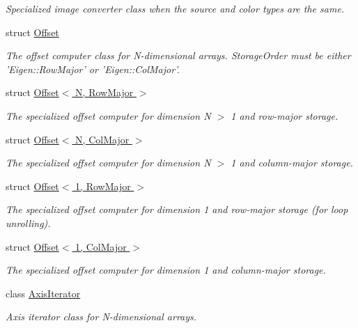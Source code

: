 \begin{DoxyCompactItemize}
\begin{DoxyCompactList}\small\item\em Specialized image converter class when the source and color types are the same. \end{DoxyCompactList}\item 
struct \hyperlink{struct_d_o_1_1_offset}{Offset}
\begin{DoxyCompactList}\small\item\em The offset computer class for N-\/dimensional arrays. Storage\-Order must be either 'Eigen\-::\-Row\-Major' or 'Eigen\-::\-Col\-Major'. \end{DoxyCompactList}\item 
struct \hyperlink{struct_d_o_1_1_offset_3_01_n_00_01_row_major_01_4}{Offset$<$ N, Row\-Major $>$}
\begin{DoxyCompactList}\small\item\em The specialized offset computer for dimension N $>$ 1 and row-\/major storage. \end{DoxyCompactList}\item 
struct \hyperlink{struct_d_o_1_1_offset_3_01_n_00_01_col_major_01_4}{Offset$<$ N, Col\-Major $>$}
\begin{DoxyCompactList}\small\item\em The specialized offset computer for dimension N $>$ 1 and column-\/major storage. \end{DoxyCompactList}\item 
struct \hyperlink{struct_d_o_1_1_offset_3_011_00_01_row_major_01_4}{Offset$<$ 1, Row\-Major $>$}
\begin{DoxyCompactList}\small\item\em The specialized offset computer for dimension 1 and row-\/major storage (for loop unrolling). \end{DoxyCompactList}\item 
struct \hyperlink{struct_d_o_1_1_offset_3_011_00_01_col_major_01_4}{Offset$<$ 1, Col\-Major $>$}
\begin{DoxyCompactList}\small\item\em The specialized offset computer for dimension 1 and column-\/major storage. \end{DoxyCompactList}\item 
class \hyperlink{class_d_o_1_1_axis_iterator}{Axis\-Iterator}
\begin{DoxyCompactList}\small\item\em Axis iterator class for N-\/dimensional arrays. \end{DoxyCompactList}\item 

\end{DoxyCompactItemize}
